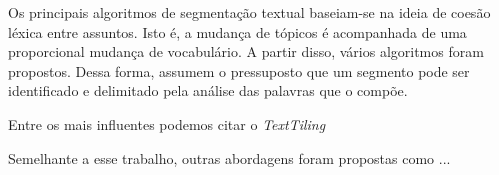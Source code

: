 
Os principais algoritmos de segmentação textual baseiam-se na ideia de coesão léxica entre assuntos. Isto é, a mudança de tópicos é acompanhada de uma proporcional mudança de vocabulário. A partir disso, vários algoritmos foram propostos. Dessa forma, assumem o pressuposto que um segmento pode ser identificado e delimitado pela análise das palavras que o compõe.


 
 










	
%



Entre os mais influentes podemos citar o \textit{TextTiling}~\cite{Hearst1994} 




Semelhante a esse trabalho, outras abordagens foram propostas como ...



%
%
%
%
%


















